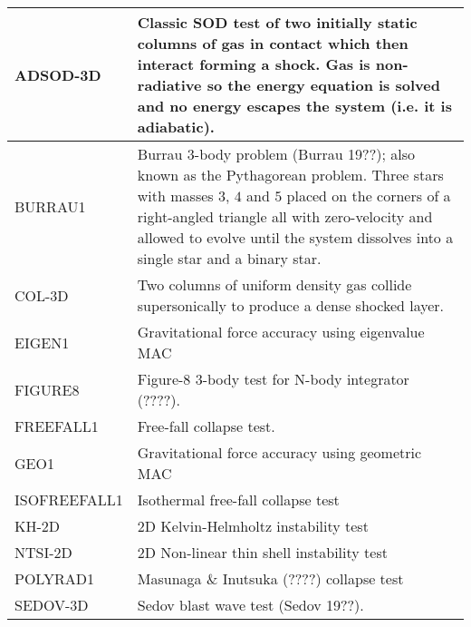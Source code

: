 \documentclass[a4paper]{article}
\begin{document}
\tabletail{\hline}
\tablelasttail{\hline}
\begin{center}
\begin{supertabular}{|p{3cm}|p{10cm}|}
ADSOD-3D & Classic SOD test of two initially static columns of gas in contact 
           which then interact  forming a shock. Gas is non-radiative so 
           the energy equation is solved and no energy  escapes the system
           (i.e. it is adiabatic). \\ \hline

BURRAU1  & Burrau 3-body problem (Burrau 19??); also known as the Pythagorean 
           problem.  Three stars with masses $3$, $4$ and $5$ placed on the 
           corners of a right-angled triangle all with zero-velocity and 
           allowed to evolve until the system dissolves into a single star 
           and a binary star. \\ \hline

COL-3D   & Two columns of uniform density gas collide supersonically to produce
           a dense shocked layer. \\ \hline

EIGEN1   & Gravitational force accuracy using eigenvalue MAC \\ \hline

FIGURE8  & Figure-8 3-body test for N-body integrator (????). \\ \hline

FREEFALL1 & Free-fall collapse test. \\ \hline

GEO1     & Gravitational force accuracy using geometric MAC \\ \hline

ISOFREEFALL1 & Isothermal free-fall collapse test \\ \hline

KH-2D    & 2D Kelvin-Helmholtz instability test \\ \hline

NTSI-2D  & 2D Non-linear thin shell instability test \\ \hline

POLYRAD1 & Masunaga \& Inutsuka (????) collapse test \\ \hline

SEDOV-3D & Sedov blast wave test (Sedov 19??). \\ \hline


\end{supertabular}
\end{center}
\end{document}
